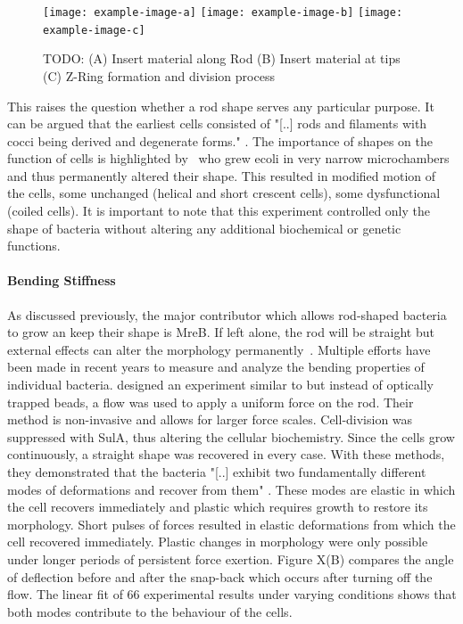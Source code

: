 \documentclass{article}
\begin{document}
\begin{figure}[H]
    \centering
    \texttt{[image: example-image-a]}
    \texttt{[image: example-image-b]}
    \texttt{[image: example-image-c]}
    \caption{TODO:
        (A) Insert material along Rod
        (B) Insert material at tips
        (C) Z-Ring formation and division process
    }
\end{figure}

This raises the question whether a rod shape serves any particular purpose.
It can be argued that the earliest cells consisted of "[..] rods and filaments with cocci being
derived and degenerate forms." \cite{Young2006}.
The importance of shapes on the function of cells is highlighted by~\cite{Takeuchi2005} who grew
\ac{ecoli} in very narrow microchambers and thus permanently altered their shape.
This resulted in modified motion of the cells, some unchanged (helical and short crescent cells),
some dysfunctional (coiled cells).
It is important to note that this experiment controlled only the shape of bacteria without altering
any additional biochemical or genetic functions.

\paragraph{Bending Stiffness}

As discussed previously, the major contributor which allows rod-shaped bacteria to grow an keep
their shape is MreB.
If left alone, the rod will be straight but external effects can alter the morphology
permanently~\cite{Takeuchi2005}.
Multiple efforts have been made in recent years to measure and analyze the bending properties of
individual bacteria.
\cite{Amir2014_2} designed an experiment similar to \cite{Wang2010} but instead of optically trapped
beads, a flow was used to apply a uniform force on the rod.
Their method is non-invasive and allows for larger force scales.
Cell-division was suppressed with SulA, thus altering the cellular biochemistry.
Since the cells grow continuously, a straight shape was recovered in every case.
With these methods, they demonstrated that the bacteria "[..] exhibit two fundamentally different
modes of deformations and recover from them" \cite{Amir2014_2}.
These modes are elastic in which the cell recovers immediately and plastic which requires growth to
restore its morphology.
Short pulses of forces resulted in elastic deformations from which the cell recovered immediately.
Plastic changes in morphology were only possible under longer periods of persistent force exertion.
Figure X(B) compares the angle of deflection before and after the snap-back
which occurs after turning off the flow.
The linear fit of 66 experimental results under varying conditions shows that both modes contribute
to the behaviour of the cells.
\end{document}
